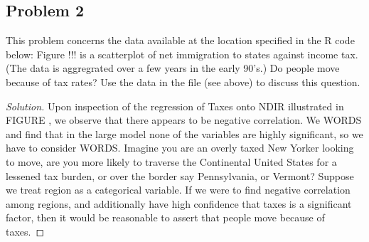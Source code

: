 \documentclass{amsart}
\begin{document}
		\subsection{Problem 2} %
		\label{sub:problem_2}
		This problem concerns the data available at the location specified in the R code below:
		Figure !!! is a scatterplot of net immigration to states against income tax.
		(The data is aggregrated over a few years in the early 90's.)
		Do people move because of tax rates? 
		Use the data in the file (see above) to discuss this question.
		\begin{proof}[Solution]
			Upon inspection of the regression of Taxes onto NDIR illustrated in FIGURE , we observe that there appears to be negative correlation.
			We WORDS and find that in the large model none of the variables are highly significant, so we have to consider WORDS.
			Imagine you are an overly taxed New Yorker looking to move, are you more likely to traverse the Continental United States for a lessened tax burden, or over the border say Pennsylvania, or Vermont?
			Suppose we treat region as a categorical variable. 
			If we were to find negative correlation among regions, and additionally have high confidence that taxes is a significant factor, then it would be reasonable to assert that people move because of taxes.
		\end{proof}
\end{document}

